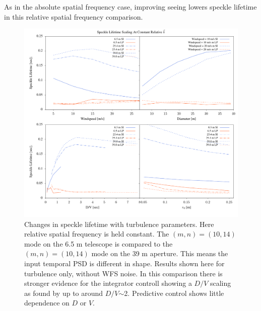 \documentclass[11pt,preprint]{aastex}
\begin{document}
As in the absolute spatial frequency case, improving seeing lowers speckle lifetime in this relative spatial frequency comparison.

\begin{figure}
\includegraphics[width=5.5in]{scalings_rel.pdf}
\caption{Changes in speckle lifetime with turbulence parameters.  Here relative spatial frequency is held constant.  The $(m,n)=(10,14)$ mode on the 6.5 m telescope is compared to the $(m,n)=(10,14)$ mode on the 39 m aperture.  This means the input temporal PSD is different in shape.  Results shown here for turbulence only, without WFS noise. In this comparison there is stronger evidence for the integrator controll showing a $D/V$ scaling as found by \citet{2005SPIE.5903..170M} up to around $D/V$$\sim$2. Predictive control shows little dependence on $D$ or $V$.  
\label{fig:scalings_rel}
}
\end{figure}
\end{document}
